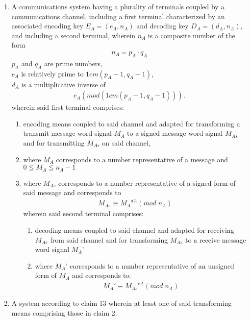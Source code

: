 \documentclass[12pt, a4paper]{article}
\begin{document}
\begin{enumerate}
\item A communications system having a plurality of terminals coupled by a communications channel, including a first terminal characterized by an associated encoding key $E_A =(e_A, n_A)$ and decoding key $D_A =(d_A, n_A)$, and including a second terminal, wherein $n_A$ is a composite number of the form
		\begin{gather*}
			n_A = p_A \cdot q_A
		\end{gather*}	
	$p_A$ and $q_A$ are prime numbers, \\
	$e_A$ is relatively prime to $1cm(p_A-1, q_A-1)$, \\
	$d_A$ is a multiplicative inverse of 
		\begin{gather*}
			e_A(mod(1cm(p_A-1, q_A-1))).
		\end{gather*}	
wherein said first terminal comprises:
	\begin{enumerate}
		\item	
		encoding means coupled to said channel and adapted for transforming a transmit message word signal $M_A$ to a signed message word signal $M_{As}$ and for transmitting $M_{As}$ on said channel,
		\item
where $M_A$ corresponds to a number representative of a message and
$0 \leqq M_A \leqq n_A-1$
		\item
where $M_{As}$ corresponds to a number representative of a signed form of said message and corresponds to
		\begin{gather*}
			M_{As} \equiv {M_A}^{dA} (mod \; n_A)
		\end{gather*}
wherein said second terminal comprises:
\begin{enumerate}
	\item
	decoding means coupled to said channel and adapted for receiving $M_{As}$ from said channel and for transforming $M_{As}$ to a receive message word signal $M_A$'

\item
where $M_A$' corresponds to a number representative of an unsigned form of $M_A$ and corresponds to:
		\begin{gather*}
			M_{A}' \equiv {M_{As}}^{eA} (mod \; n_A)
		\end{gather*}
		\end{enumerate}
	\end{enumerate}
	
\item A system according to claim 13 wherein at least one of said transforming means comprising those in claim 2.



\end{enumerate}
\end{document}
